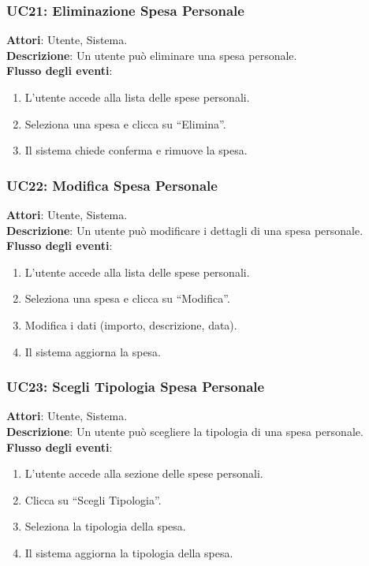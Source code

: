 \subsubsection{UC21: Eliminazione Spesa Personale}
\textbf{Attori}: Utente, Sistema. \\
\textbf{Descrizione}: Un utente può eliminare una spesa personale. \\
\textbf{Flusso degli eventi}:
\begin{enumerate}
    \item L’utente accede alla lista delle spese personali.
    \item Seleziona una spesa e clicca su ``Elimina''.
    \item Il sistema chiede conferma e rimuove la spesa.
\end{enumerate}

\subsubsection{UC22: Modifica Spesa Personale}
\textbf{Attori}: Utente, Sistema. \\
\textbf{Descrizione}: Un utente può modificare i dettagli di una spesa personale. \\
\textbf{Flusso degli eventi}:
\begin{enumerate}
    \item L’utente accede alla lista delle spese personali.
    \item Seleziona una spesa e clicca su ``Modifica''.
    \item Modifica i dati (importo, descrizione, data).
    \item Il sistema aggiorna la spesa.
\end{enumerate}

\subsubsection{UC23: Scegli Tipologia Spesa Personale}
\textbf{Attori}: Utente, Sistema. \\
\textbf{Descrizione}: Un utente può scegliere la tipologia di una spesa personale. \\
\textbf{Flusso degli eventi}:
\begin{enumerate}
    \item L’utente accede alla sezione delle spese personali.
    \item Clicca su ``Scegli Tipologia''.
    \item Seleziona la tipologia della spesa.
    \item Il sistema aggiorna la tipologia della spesa.
\end{enumerate}

